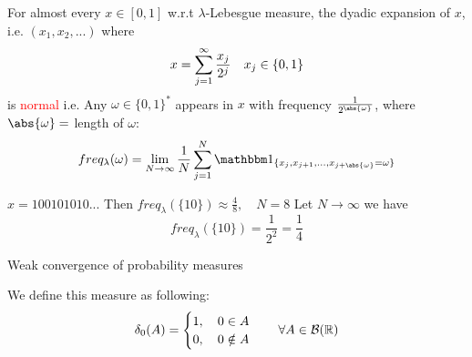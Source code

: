 \begin{thm}
\label{Borel}
For almost every $x\in[0,1]$ w.r.t $\lambda$-Lebesgue measure, the dyadic expansion of $x$, i.e. $(x_1, x_2, ...)$ where
\begin{equation*}
    x = \sum\limits_{j=1}^\infty \frac{x_j}{2^j} \quad x_j \in\{0,1\}
\end{equation*}is \textcolor{red}{normal} i.e. Any $\omega \in \{0,1\}^*$ appears in $x$ with frequency $\frac{1}{2^{\abs{\omega}}} $, where $\abs{\omega} =$ length of $\omega$: 
\begin{equation*}
    freq_\lambda(\omega) = \biglim{N\rightarrow\infty}\frac{1}{N}\bigs{j=1}^N \I_{\{x_j, x_{j+1}, ..., x_{j+\abs{\omega}}=  \omega\}}
\end{equation*}
\end{thm}
\begin{example}
$x = 100101010...$ Then $freq_\lambda(\{10\}) \approx \frac{4}{8}, \quad N = 8$ Let $N\rightarrow \infty$ we have 
\begin{equation*}
    freq_\lambda(\{10\}) = \frac{1}{2^2} = \frac{1}{4}
\end{equation*}
\end{example}

\newpage
Weak convergence of probability measures
\begin{dfn}We define this measure as following:
\begin{equation*}
    \delta_0(A) = \begin{cases}
    1, \quad 0\in A \\ 
    0, \quad 0\notin A
    \end{cases}\quad \forall A\in \mathcal{B}(\mathbb{R})
\end{equation*}

\end{dfn}

